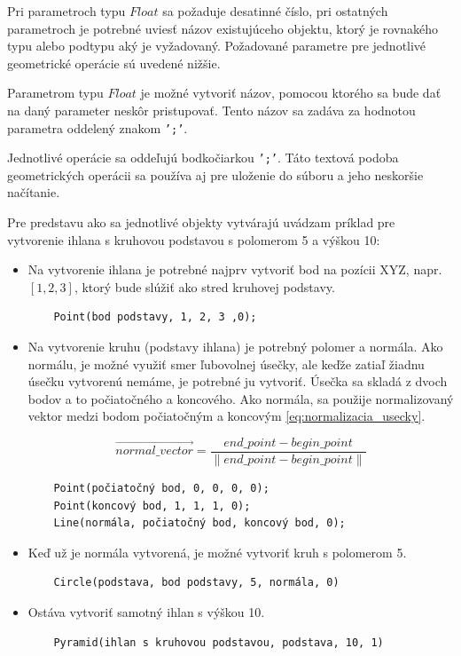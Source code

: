 Pri parametroch typu $Float$ sa požaduje desatinné číslo, pri ostatných parametroch je potrebné uviesť názov existujúceho objektu, ktorý je rovnakého typu alebo podtypu aký je vyžadovaný. Požadované parametre pre jednotlivé geometrické operácie sú uvedené nižšie. 

Parametrom typu $Float$ je možné vytvoriť názov, pomocou ktorého sa bude dať na daný parameter neskôr pristupovať. 
Tento názov sa zadáva za hodnotou parametra oddelený znakom \texttt{';'}.

Jednotlivé operácie sa oddeľujú bodkočiarkou \texttt{';'}. 
Táto textová podoba geometrických operácii sa používa aj pre uloženie do súboru a jeho neskoršie načítanie. 

Pre predstavu ako sa jednotlivé objekty vytvárajú uvádzam príklad pre vytvorenie ihlana s kruhovou podstavou s polomerom 5 a výškou 10:
\begin{itemize}
    \item Na vytvorenie ihlana je potrebné najprv vytvoriť bod na pozícii XYZ, napr. $\left [ 1, 2, 3 \right ]$, ktorý bude slúžiť ako stred kruhovej podstavy.
	\begin{lstlisting}
	Point(bod podstavy, 1, 2, 3 ,0);
	\end{lstlisting}
	\item Na vytvorenie kruhu (podstavy ihlana) je potrebný polomer a normála. Ako normálu, je možné využiť smer ľubovolnej úsečky, ale keďže zatiaľ žiadnu úsečku vytvorenú nemáme, je potrebné ju vytvoriť. Úsečka sa skladá z dvoch bodov a to počiatočného a koncového. Ako normála, sa použije normalizovaný vektor medzi bodom počiatočným a koncovým \ref{eq:normalizacia_usecky}.

	\begin{equation}
		\overrightarrow{normal\_vector}=
		\frac{end\_point - begin\_point}{
		\left \|  end\_point - begin\_point \right \|}
	\label{eq:normalizacia_usecky}
	\end{equation}

	\begin{lstlisting}
	Point(počiatočný bod, 0, 0, 0, 0);
	Point(koncový bod, 1, 1, 1, 0);
	Line(normála, počiatočný bod, koncový bod, 0);
	\end{lstlisting}
	\item Keď už je normála vytvorená, je možné vytvoriť kruh s polomerom 5.
	\begin{lstlisting}
	Circle(podstava, bod podstavy, 5, normála, 0) 
	\end{lstlisting}
	\item Ostáva vytvoriť samotný ihlan s výškou 10.
	\begin{lstlisting}
	Pyramid(ihlan s kruhovou podstavou, podstava, 10, 1)
	\end{lstlisting}
\end{itemize}

